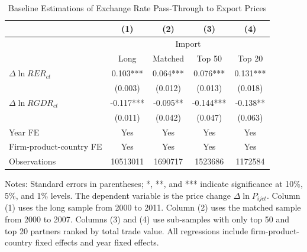 \documentclass[12pt]{article}
\begin{document}
\setcounter{table}{0}

\renewcommand{\thetable}{A\arabic{table}}

\begin{table}[htbp]
	\centering
	\caption{Baseline Estimations of Exchange Rate Pass-Through to Export Prices}
	\begin{threeparttable}
		\begin{tabular}{lcccc}
			\toprule
			& (1)   & (2)   & (3)   & (4) \\
			\midrule
			& \multicolumn{4}{c}{Import} \\
			& Long & Matched & Top 50 & Top 20 \\
			\midrule
			$\Delta \ln RER_{ct}$ & 0.103*** & 0.064*** & 0.076*** & 0.131*** \\
			& (0.003) & (0.012) & (0.013) & (0.018) \\
			$\Delta \ln RGDR_{ct}$ &  -0.117*** & -0.095** & -0.144*** & -0.138** \\
			& (0.011) & (0.042) & (0.047) & (0.063) \\
			Year FE  & Yes   & Yes   & Yes   & Yes \\
			Firm-product-country FE & Yes   & Yes   & Yes   & Yes \\
			Observations & 10513011 & 1690717 & 1523686 & 1172584 \\
			\bottomrule
		\end{tabular}
		\begin{tablenotes}
			\footnotesize
			\item[Notes:] Standard errors in parentheses; *, **, and *** indicate significance at 10\%, 5\%, and 1\% levels. The dependent variable is the price change $\Delta \ln P_{ijct}$. Column (1) uses the long sample from 2000 to 2011. Column (2) uses the matched sample from 2000 to 2007. Columns (3) and (4) use sub-samples with only top 50 and top 20 partners ranked by total trade value. All regressions include firm-product-country fixed effects and year fixed effects. 
		\end{tablenotes}
	\end{threeparttable}
	\label{tab.baseline.exp}
\end{table}
\end{document}
